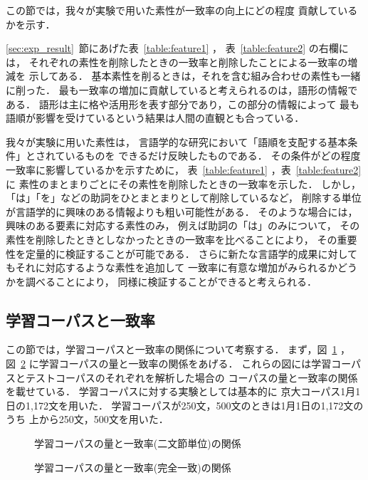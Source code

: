 この節では，我々が実験で用いた素性が一致率の向上にどの程度
貢献しているかを示す．

\ref{sec:exp_result}~節にあげた表~\ref{table:feature1} ，
表~\ref{table:feature2} の右欄には，
それぞれの素性を削除したときの一致率と削除したことによる一致率の増減を
示してある．
基本素性を削るときは，それを含む組み合わせの素性も一緒に削った．
最も一致率の増加に貢献していると考えられるのは，語形の情報である．
語形は主に格や活用形を表す部分であり，この部分の情報によって
最も語順が影響を受けているという結果は人間の直観とも合っている．

我々が実験に用いた素性は，
言語学的な研究において「語順を支配する基本条件」とされているものを
できるだけ反映したものである．
その条件がどの程度一致率に影響しているかを示すために，
表~\ref{table:feature1} ，表~\ref{table:feature2} に
素性のまとまりごとにその素性を削除したときの一致率を示した．
しかし，「は」「を」などの助詞をひとまとまりとして削除しているなど，
削除する単位が言語学的に興味のある情報よりも粗い可能性がある．
そのような場合には，興味のある要素に対応する素性のみ，
例えば助詞の「は」のみについて，
その素性を削除したときとしなかったときの一致率を比べることにより，
その重要性を定量的に検証することが可能である．
さらに新たな言語学的成果に対してもそれに対応するような素性を追加して
一致率に有意な増加がみられるかどうかを調べることにより，
同様に検証することができると考えられる．

\subsection{学習コーパスと一致率}
\label{sec:corpus_and_accuracy}

この節では，学習コーパスと一致率の関係について考察する．
まず，図~\ref{fig:learning_curve1} ，
図~\ref{fig:learning_curve2} に学習コーパスの量と一致率の関係をあげる．
これらの図には学習コーパスとテストコーパスのそれぞれを解析した場合の
コーパスの量と一致率の関係を載せている．
学習コーパスに対する実験としては基本的に
京大コーパス1月1日の1,172文を用いた．
学習コーパスが250文，500文のときは1月1日の1,172文のうち
上から250文，500文を用いた．

\begin{figure}[htbp]
  \begin{center}
    \leavevmode
\vspace{5mm}
    \caption{学習コーパスの量と一致率(二文節単位)の関係}
    \label{fig:learning_curve1}
  \end{center}
\end{figure}
\begin{figure}[htbp]
  \begin{center}
    \leavevmode
\vspace{5mm}
    \caption{学習コーパスの量と一致率(完全一致)の関係}
    \label{fig:learning_curve2}
  \end{center}
\end{figure}

